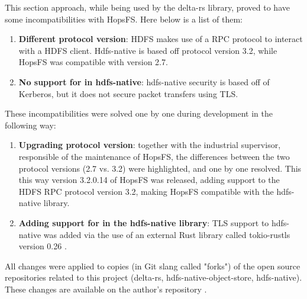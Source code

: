 This section approach, while being used by the delta-rs library, proved to have some incompatibilities with \gls{HopsFS}. Here below is a list of them:
\begin{enumerate}
  \item \textbf{Different  protocol version}: \gls{HDFS} makes use of a \gls{RPC} protocol to interact with a \gls{HDFS} client. Hdfs-native is based off protocol version 3.2, while \gls{HopsFS} was compatible with version 2.7.
  \item \textbf{No support for  in hdfs-native}: hdfs-native security is based off of Kerberos, but it does not secure packet transfers using \gls{TLS}.
\end{enumerate}
These incompatibilities were solved one by one during development in the following way:
\begin{enumerate}
  \item \textbf{Upgrading  protocol version}: together with the industrial supervisor, responsible of the maintenance of \gls{HopsFS}, the differences between the two protocol versions (2.7 vs. 3.2) were highlighted, and one by one resolved. This this way version 3.2.0.14 of \gls{HopsFS} was released, adding support to the \gls{HDFS} \gls{RPC} protocol version 3.2, making \gls{HopsFS} compatible with the hdfs-native library.
  \item \textbf{Adding support for  in the hdfs-native library}: \gls{TLS} support to hdfs-native was added via the use of an external Rust library called tokio-rustls version 0.26 \cite{RustlsTokiorustlsAsync}.
\end{enumerate}

All changes were applied to copies (in Git slang called "forks") of the open source repositories related to this project (delta-rs, hdfs-native-object-store, hdfs-native). These changes are available on the author's repository \cite{manfrediSilemoHdfsnative2024, manfrediSilemoHdfsnativeobjectstore2024, manfrediSilemoDeltars2024}.